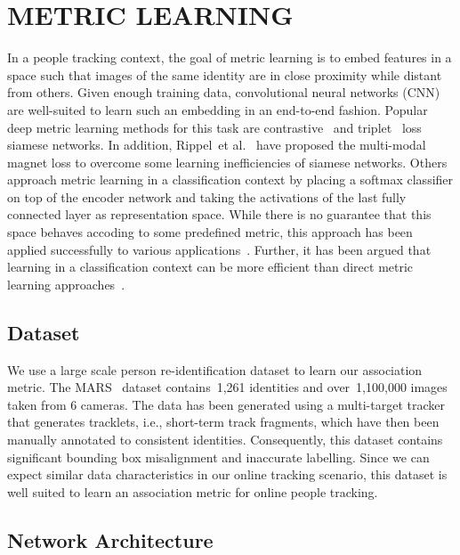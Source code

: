 \documentclass{article}
\newcommand{\etal}{et al.}
\begin{document}
\section{METRIC LEARNING}
\label{sec:metric_learning}
In a people tracking context, the goal of metric learning is to embed features
in a space such that images of the same identity are in close proximity while
distant from others.
Given enough training data, convolutional neural networks (CNN) are well-suited
to learn such an embedding in an end-to-end fashion.
Popular deep metric learning methods for this task are
contrastive~\cite{Chopra2005} and triplet~\cite{weinberger2009distance}
loss siamese networks. In addition,
Rippel~\etal~\cite{Rippel2016a} have proposed the multi-modal
magnet loss to overcome some learning inefficiencies of siamese
networks.
Others approach metric learning in a classification context by placing a
softmax classifier on top of the encoder network and taking the activations of
the last fully connected layer as representation space.
While there is no guarantee that this space behaves accoding to some predefined
metric, this approach has been applied successfully to various
applications~\cite{Taigman2014, Xiao2016, zheng2016person}.
Further, it has been argued that learning in a classification context can be
more efficient than direct metric learning
approaches~\cite{Rippel2016a, Taigman2014}.


\subsection{Dataset}

We use a large scale person re-identification dataset to learn our association
metric.
The MARS~\cite{Zheng2016} dataset contains~1,261 identities and
over~1,100,000 images taken from 6 cameras.
The data has been generated using a multi-target tracker that generates
tracklets, i.e., short-term track fragments, which have then been manually
annotated to consistent identities.
Consequently,
this dataset contains significant bounding box misalignment and inaccurate
labelling.
Since we can expect similar data characteristics in our online tracking
scenario, this dataset is well suited to learn an association metric for online
people tracking.

\subsection{Network Architecture}
\end{document}
